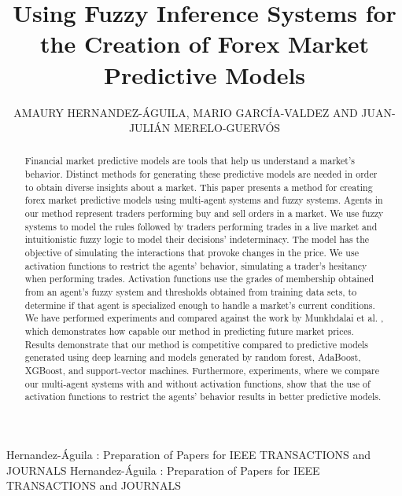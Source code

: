 \documentclass{ieeeaccess}
\begin{document}

\title{Using Fuzzy Inference Systems for the Creation of Forex Market Predictive Models}
\author{
    \uppercase{Amaury Hernandez-\'{A}guila,
    \uppercase{Mario Garc\'{i}a-Valdez
      and
    Juan-Julián Merelo-Guerv\'{o}s}}}
\address[1]{National Technological Institute of Mexico, Calzada Del Tecnoló\'{o}ico s/n, Fraccionamiento Tomas Aquino, Tijuana, BC 22414 Mexico (e-mail: {amerhag,mario}@tectijuana.edu.mx)}
\address[2]{University of Granada, Campus Aynadamar Daniel Saucedo Aranda s/n, Granada 18071, 80523 Spain (e-mail: jmerelo@geneura.ugr.es)}

\markboth
{Hernandez-\'{A}guila \headeretal: Preparation of Papers for IEEE TRANSACTIONS and JOURNALS}
{Hernandez-\'{A}guila \headeretal: Preparation of Papers for IEEE TRANSACTIONS and JOURNALS}


\begin{abstract}
  Financial market predictive models are tools that help us
understand a market's behavior. Distinct methods for generating these predictive
models are needed in order to obtain diverse insights about a market. This paper
presents a method for creating forex market predictive models using multi-agent
systems and fuzzy systems. Agents in our method represent traders performing buy
and sell orders in a market. We use fuzzy systems to model the rules followed by
traders performing trades in a live market and intuitionistic fuzzy logic to
model their decisions' indeterminacy. The model has the objective of simulating
the interactions that provoke changes in the price. We use activation functions
to restrict the agents' behavior, simulating a trader's hesitancy when
performing trades. Activation functions use the grades of membership obtained
from an agent's fuzzy system and thresholds obtained from training data sets, to
determine if that agent is specialized enough to handle a market's current
conditions. We have performed experiments and compared against the work by
Munkhdalai et al. , which demonstrates how capable our method in predicting
future market prices. Results demonstrate that our method is competitive
compared to predictive models generated using deep learning and models generated
by random forest, AdaBoost, XGBoost, and support-vector machines. Furthermore,
experiments, where we compare our multi-agent systems with and without
activation functions, show that the use of activation functions to restrict the
agents' behavior results in better predictive models. \end{abstract}
\end{document}
